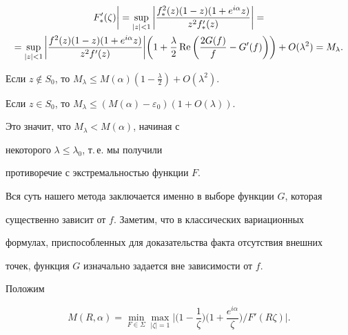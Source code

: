 \begin{pf}
\begin{multline*}
{F_*'(\zeta)}\bigg| = \sup_{|z|<1}


\bigg|\frac{f_{*}^2(z)(1-z)(1+e^{i\alpha}z)}{z^2f_*'(z)}\bigg| = \\


%


= \sup_{|z|<1}


\bigg|\frac{f^2(z)(1-z)(1+e^{i\alpha}z)}{z^2f'(z)}\bigg|\bigg(


1+\frac{\lambda}{2}\re\bigg(\frac{2G(f)}{f}-G'(f)


\bigg)\bigg) + O(\lambda^2)=M_{\lambda}.


\end{multline*}


Если $z \notin S_0$, то $M_{\lambda} \leq


M(\alpha)(1-\frac{\lambda}{2})+O(\lambda^2)$.


Если $z \in S_0$, то $M_{\lambda} \leq (M(\alpha)-\varepsilon_0)


(1+O(\lambda))$.


Это значит, что $M_{\lambda} < M(\alpha)$, начиная с


некоторого $\lambda \leq \lambda_0$, т.\,е. мы получили


противоречие с экстремальностью функции $F$.


\end{pf}





\begin{notenonum}


Вся суть нашего метода заключается именно в выборе функции $G$, которая


существенно зависит от $f$. Заметим, что в классических вариационных


формулах, приспособленных для доказательства факта отсутствия внешних


точек, функция $G$ изначально задается вне зависимости от $f$.


\end{notenonum}





Положим


$$


M(R,\alpha)=\min_{F \in \Sigma}\max_{|\zeta|=1}


\bigg|\bigg(1-\frac{1}{\zeta}\bigg)\bigg(1+\frac{e^{i\alpha}}{\zeta}\bigg)/


F'(R\zeta)\bigg|.


$$


